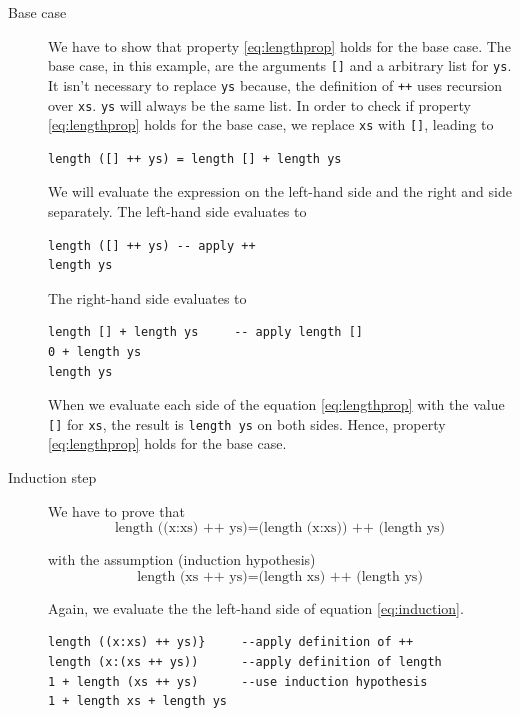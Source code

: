 \begin{description}
\item[Base case]
We have to show that property \ref{eq:lengthprop} holds for the base case. The base case, in this example, are the arguments \verb|[]| and a arbitrary list for \verb|ys|. It isn't necessary to replace \verb|ys| because, the definition of \verb|++| uses recursion over \verb|xs|. \verb|ys| will always be the same list.
In order to check if property \ref{eq:lengthprop} holds for the base case, we replace \verb|xs| with  \verb|[]|, leading to

\begin{verbatim}
length ([] ++ ys) = length [] + length ys
\end{verbatim}

We will evaluate the expression on the left-hand side and the right and side separately.
The left-hand side evaluates to

\begin{verbatim}
length ([] ++ ys) -- apply ++
length ys
\end{verbatim}

The right-hand side evaluates to 

\begin{verbatim}
length [] + length ys     -- apply length []
0 + length ys
length ys
\end{verbatim}

When we evaluate each side of the equation \ref{eq:lengthprop} with the value \verb|[]| for \verb|xs|, the result is \verb|length ys| on both sides. Hence, property \ref{eq:lengthprop} holds for the base case.

\item[Induction step]
 We have to prove that
\begin{equation}
  \label{eq:induction}
    \text{length ((x:xs) ++ ys)} = \text{(length (x:xs)) ++ (length ys)}
\end{equation}

with the assumption (induction hypothesis)
\begin{equation}
  \label{eq:induction_hypothesis}
      \text{length (xs ++ ys)} = \text{(length xs) ++ (length ys)}
\end{equation}

Again, we evaluate the the left-hand side of equation \ref{eq:induction}.

\begin{program}
\begin{verbatim}
length ((x:xs) ++ ys)}     --apply definition of ++
length (x:(xs ++ ys))      --apply definition of length
1 + length (xs ++ ys)      --use induction hypothesis
1 + length xs + length ys
\end{verbatim}
\end{program}


\end{description}
